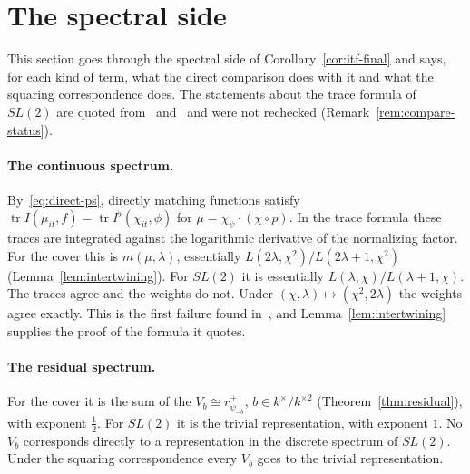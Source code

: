\section{The spectral side}\label{sec:compare-spectral}

This section goes through the spectral side of
Corollary~\ref{cor:itf-final} and says, for each kind of term, what the
direct comparison does with it and what the squaring correspondence
does. The statements about the trace formula of $SL(2)$ are quoted
from~\cite{LL79} and~\cite{GJ79} and were not rechecked
(Remark~\ref{rem:compare-status}).

\paragraph{The continuous spectrum.} By~\eqref{eq:direct-ps}, directly
matching functions satisfy $\operatorname{tr}I(\mu_{it},f)=
\operatorname{tr}I^\flat(\chi_{it},\phi)$ for $\mu=\chi_\psi\cdot(\chi\circ
p)$. In the trace formula these traces are integrated against the
logarithmic derivative of the normalizing factor. For the cover this is
$m(\mu,\lambda)$, essentially $L(2\lambda,\chi^2)/L(2\lambda+1,\chi^2)$
(Lemma~\ref{lem:intertwining}). For $SL(2)$ it is essentially
$L(\lambda,\chi)/L(\lambda+1,\chi)$. The traces agree and the weights do
not. Under $(\chi,\lambda)\mapsto(\chi^2,2\lambda)$ the weights agree
exactly. This is the first failure found in~\cite{JC26}, and
Lemma~\ref{lem:intertwining} supplies the proof of the formula it
quotes.

\paragraph{The residual spectrum.} For the cover it is the sum of the
$V_b\cong r^+_{\psi_{-b}}$, $b\in k^\times/k^{\times2}$
(Theorem~\ref{thm:residual}), with exponent $\frac12$. For $SL(2)$ it is
the trivial representation, with exponent $1$. No $V_b$ corresponds
directly to a representation in the discrete spectrum of $SL(2)$. Under
the squaring correspondence every $V_b$ goes to the trivial
representation.

